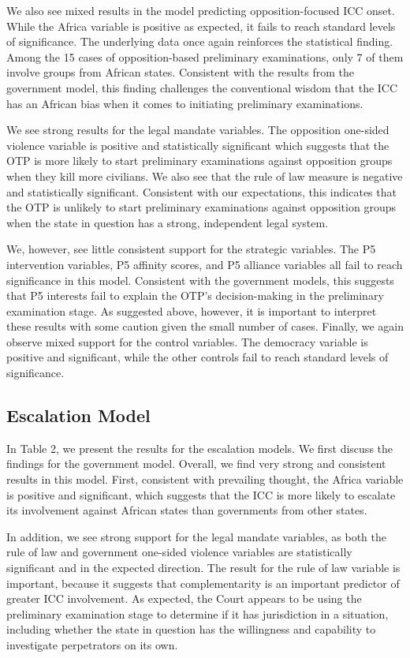 We also see mixed results in the model predicting opposition-focused ICC onset. While the Africa variable is positive as expected, it fails to reach standard levels of significance. The underlying data once again reinforces the statistical finding. Among the 15 cases of opposition-based preliminary examinations, only 7 of them involve groups from African states. Consistent with the results from the government model, this finding challenges the conventional wisdom that the ICC has an African bias when it comes to initiating preliminary examinations.

We see strong results for the legal mandate variables. The opposition one-sided violence variable is positive and statistically significant which suggests that the OTP is more likely to start preliminary examinations against opposition groups when they kill more civilians. We also see that the rule of law measure is negative and statistically significant. Consistent with our expectations, this indicates that the OTP is unlikely to start preliminary examinations against opposition groups when the state in question has a strong, independent legal system.

We, however, see little consistent support for the strategic variables. The P5 intervention variables, P5 affinity scores, and P5 alliance variables all fail to reach significance in this model. Consistent with the government models, this suggests that P5 interests fail to explain the OTP’s decision-making in the preliminary examination stage.  As suggested above, however, it is important to interpret these results with some caution given the small number of cases.  Finally, we again observe mixed support for the control variables. The democracy variable is positive and significant, while the other controls fail to reach standard levels of significance.

\subsection*{Escalation Model}

In Table 2, we present the results for the escalation models. We first discuss the findings for the government model.  Overall, we find very strong and consistent results in this model.  First, consistent with prevailing thought, the Africa variable is positive and significant, which suggests that the ICC is more likely to escalate its involvement against African states than governments from other states.

In addition, we see strong support for the legal mandate variables, as both the rule of law and government one-sided violence variables are statistically significant and in the expected direction. The result for the rule of law variable is important, because it suggests that complementarity is an important predictor of greater ICC involvement. As expected, the Court appears to be using the preliminary examination stage to determine if it has jurisdiction in a situation, including whether the state in question has the willingness and capability to investigate perpetrators on its own.

